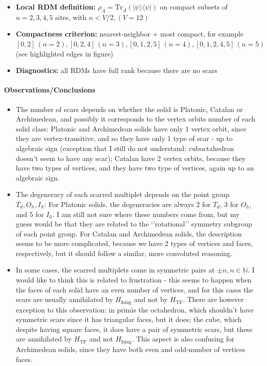 \documentclass[11pt,a4paper]{article}
\newcommand{\Hising}{H_{\mathrm{Ising}}}
\newcommand{\Htf}{H_{\mathrm{TF}}}
\begin{document}
\begin{itemize}[leftmargin=1.5em]
  \item \textbf{Local RDM definition:} $\rho_A=\mathrm{Tr}_{\bar A}(|\psi\rangle\langle\psi|)$ on compact subsets of $n=2,3,4,5$ sites, with $n < V/2, (V=12)$
  \item \textbf{Compactness criterion:} nearest-neighbor + most compact, for example $[0,2] \, (n = 2), [0,2,4] \, (n = 3), [0,1,2,5] \,  (n = 4), [0,1,2,4,5] \, (n = 5)$ (see highlighted edges in figure)
  \item \textbf{Diagnostics:} all RDMs have full rank because there are no scars
\end{itemize}


\paragraph*{Observations/Conclusions}

\begin{itemize}
\item The number of scars depends on whether the solid is Platonic, Catalan or Archimedean, and possibly it corresponds to the vertex orbits number of each solid class: Platonic and Archimedean solids have only 1 vertex orbit, since they are vertex-transitive, and so they have only 1 type of scar - up to algebraic sign (exception that I still do not understand: cuboctahedron doesn't seem to have any scar); Catalan have 2 vertex orbits, because they have two types of vertices, and they have two type of vertices, again up to an algebraic sign.\\
\item The degeneracy of each scarred multiplet depends on the point group $T_d, O_h, I_h$: For Platonic solids, the degeneracies are always 2 for $T_d$, 3 for $O_h$, and 5 for $I_h$. I am still not sure where these numbers come from, but my guess would be that they are related to the `'rotational'' symmetry subgroup of each point group. For Catalan and Archimedean solids, the description seems to be more complicated, because we have 2 types of vertices and faces, respectively, but it should follow a similar, more convoluted reasoning.
\item In some cases, the scarred multiplets come in symmetric pairs at $\pm n, n\in\mathbb{N}$. I would like to think this is related to frustration - this seems to happen when the faces of each solid have an even number of vertices, and for this cases the scars are usually annihilated by $\Hising$ and not by $\Htf$. There are however exception to this observation: in primis the octahedron, which shouldn't have symmetric scars since it has triangular faces, but it does; the cube, which despite having square faces, it does have a pair of symmetric scars, but these are annihilated by $\Htf$ and not  $\Hising$. This aspect is also confusing for Archimedean solids, since they have both even and odd-number of vertices faces.
\end{itemize}
\end{document}

